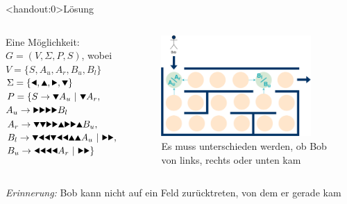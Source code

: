 {
\begin{frame}<handout:0>{Lösung}
    \begin{columns}
        \begin{alertblock}{Eine Möglichkeit:}
            $G = (V, \Sigma, P, S)$, wobei \\
            $V = \{S, A_u, A_r, B_u, B_l\}$ \\
            $\Sigma = \{\text{\Rewind}, \text{\MoveUp}, \text{\Forward}, \text{\MoveDown}\}$ \\
            $P = \{S \rightarrow \text\MoveDown A_u \ |\ \text\MoveDown A_r,$\\
            \qquad\; $A_u \rightarrow \text{\Forward\Forward\Forward\Forward} B_l$\\
            \qquad\; $A_r \rightarrow \text{\MoveDown\MoveDown\Forward\Forward\MoveUp\Forward\Forward\MoveUp} B_u,$\\
            \qquad\; $B_l \rightarrow \text{\MoveDown\Rewind\Rewind\MoveDown\Rewind\Rewind\MoveUp\MoveUp} A_u \ |\ \text{\Forward\Forward},$\\
            \qquad\; $B_u \rightarrow \text{\Rewind\Rewind\Rewind\Rewind} A_r \ |\ \text{\Forward\Forward}\}$
        \end{alertblock}
        \begin{figure}
            \centering
            \includegraphics[width=0.9\textwidth]{../figures/GBeispielHowTo.png}
            \caption{Es muss unterschieden werden, ob Bob von links, rechts oder unten kam}

        \end{figure}
    \end{columns}
    \small\emph{Erinnerung:} Bob kann nicht auf ein Feld zurücktreten, von dem er gerade kam
\end{frame}
}

